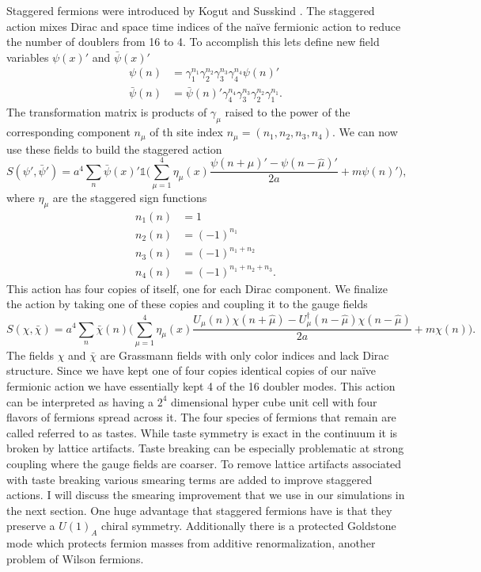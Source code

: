 Staggered fermions were introduced by Kogut and Susskind \cite{PhysRevD.11.395}.
The staggered action mixes Dirac and space time indices of the naïve fermionic action to reduce the number of doublers from 16 to 4.
To accomplish this lets define new field variables $\psi(x)'$ and $\bar{\psi}(x)'$
\begin{equation}
  \begin{aligned}
    \psi(n)&=\gamma_1^{n_1}\gamma_2^{n_2}\gamma_3^{n_3}\gamma_4^{n_4}\psi(n)'\\
    \bar{\psi}(n)&=\bar{\psi}(n)'\gamma_4^{n_4}\gamma_3^{n_3}\gamma_2^{n_2}\gamma_1^{n_1}.
  \end{aligned}
\end{equation}
The transformation matrix is products of $\gamma_\mu$ raised to the power of the corresponding component $n_\mu$ of th site index $n_\mu=(n_1,n_2,n_3,n_4)$.
We can now use these fields to build the staggered action
\begin{equation}
  S(\psi',\bar{\psi}')=a^4\sum_n \bar{\psi}(x)'\mathbb{1}\Big(\sum_{\mu=1}^4\eta_\mu(x)\frac{\psi(n+\hat{\mu})'-\psi(n-\hat{\mu})'}{2a}+m\psi(n)'\Big),
\end{equation}
where $\eta_\mu$ are the staggered sign functions
\begin{equation}
  \begin{aligned}
    n_1(n)&=1 \\
    n_2(n)&=(-1)^{n_1} \\
    n_3(n)&=(-1)^{n_1+n_2} \\
    n_4(n)&=(-1)^{n_1+n_2+n_3}.
  \end{aligned}
\end{equation}
This action has four copies of itself, one for each Dirac component.
We finalize the action by taking one of these copies and coupling it to the gauge fields
\begin{equation}
  S(\chi,\bar{\chi})=a^4\sum_n \bar{\chi}(n)\Big(\sum_{\mu=1}^4\eta_\mu(x)\frac{U_\mu(n)\chi(n+\hat{\mu})-U_\mu^\dagger(n-\hat{\mu})\chi(n-\hat{\mu})}{2a}+m\chi(n)\Big).
\end{equation}
The fields $\chi$ and $\bar{\chi}$ are Grassmann fields with only color indices and lack Dirac structure.
Since we have kept one of four copies identical copies of our naïve fermionic action we have essentially kept 4 of the 16 doubler modes.
This action can be interpreted as having a $2^4$ dimensional hyper cube unit cell with four flavors of fermions spread across it.
The four species of fermions that remain are called referred to as tastes.
While taste symmetry is exact in the continuum it is broken by lattice artifacts.
Taste breaking can be especially problematic at strong coupling where the gauge fields are coarser.
To remove lattice artifacts associated with taste breaking various smearing terms are added to improve staggered actions.
I will discuss the smearing improvement that we use in our simulations in the next section.
One huge advantage that staggered fermions have is that they preserve a $U(1)_A$ chiral symmetry.
Additionally there is a protected Goldstone mode which protects fermion masses from additive renormalization, another problem of Wilson fermions.

